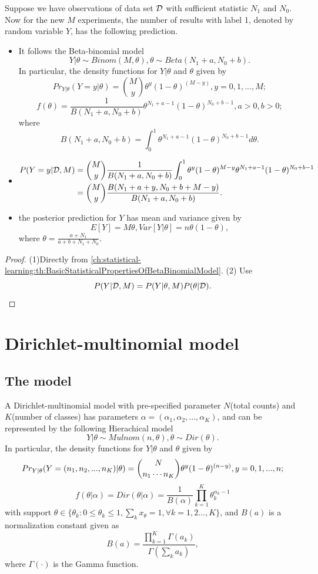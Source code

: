 \begin{refsection}
\begin{lemma}\cite[80]{murphy2012machine}
Suppose we have observations of data set $\mathcal{D}$ with sufficient statistic $N_1$ and $N_0$. Now for the new $M$ experiments, the number of results with label 1, denoted by random variable $Y$, has the following prediction.
\begin{itemize}
	\item It follows the Beta-binomial model 
	$$Y|\theta \sim Binom(M,\theta), \theta\sim Beta(N_1+a,N_0+b).$$
	In particular, 
	the density functions for $Y|\theta$ and $\theta$ given by 
	$$Pr_{Y|\theta}(Y = y|\theta) = \binom{M}{y} \theta^y(1-\theta)^{(M-y)}, y=0,1,...,M;$$
	$$f(\theta) = \frac{1}{B(N_1+a,N_0 + b)}\theta^{N_1+a-1}(1-\theta)^{N_0+b-1},a>0,b>0;$$
	where $$B(N_1+a,N_0 + b) = \int_0^1 \theta^{N_1+a-1}(1-\theta)^{N_0+ b-1} d\theta.$$
	\item 
	\begin{align*}
	P(Y=y|\mathcal{D},M) &= \binom{M}{y}\frac{1}{B(N_1+a,N_0+b)}\int_0^1 \theta^y(1-\theta)^{M-y}\theta^{N_1+a-1}(1-\theta)^{N_0+b-1}\\
	& = \binom{M}{y}\frac{B(N_1+a+y,N_0+b+M-y)}{B(N_1+a,N_0+b)}.
	\end{align*}
	\item the posterior prediction for $Y$ has mean and variance given by
		 $$E[Y] = M\theta,Var[Y|\theta] = n\theta(1-\theta),$$
		 where $\theta = \frac{a+N_1}{a+b+N_1+N_0}$.
\end{itemize}
\end{lemma}
\begin{proof}
(1)Directly from \autoref{ch:statistical-learning:th:BasicStatisticalPropertiesOfBetaBinomialModel}.
(2) Use
$$P(Y|\mathcal{D},M)= P(Y|\theta,M) P(\theta|\mathcal{D}).$$
\end{proof}


\section{Dirichlet-multinomial model}
\subsection{The model}
\begin{definition}
	A Dirichlet-multinomial model with pre-specified parameter $N$(total counts) and $K$(number of classes) has parameters $\alpha = (\alpha_1,\alpha_2,...,\alpha_K)$, and can be represented by the following Hierachical model 
	$$Y|\theta \sim Mulnom(n,\theta), \theta\sim Dir(\theta).$$
	In particular, 
	the density functions for $Y|\theta$ and $\theta$ given by 
	$$Pr_{Y|\theta}(Y = (n_1,n_2,...,n_K)|\theta) = \dbinom{N}{n_1\cdots n_K} \theta^y(1-\theta)^{(n-y)}, y=0,1,...,n;$$
	$$f(\theta|\alpha)=Dir(\theta|\alpha) = \dfrac{1}{B(\alpha)}\prod_{k=1}^K \theta_k^{\alpha_k-1}$$
	with support $\theta\in \{\theta_k:0\leq \theta_k\leq 1,\sum_k x_\theta = 1,\forall k=1,2...,K\}$, and $B(a)$ is a normalization constant given as
	$$B(a) = \frac{\prod_{k=1}^K \Gamma(a_k)}{\Gamma(\sum_k a_k)},$$
	where $\Gamma(\cdot)$ is the Gamma function. 
\end{definition}


\end{refsection}

